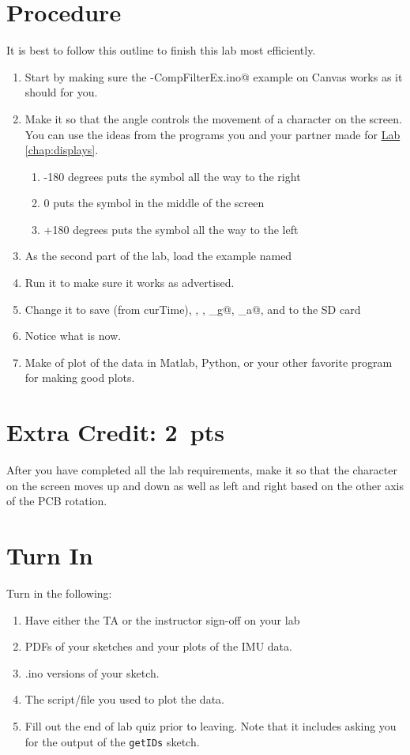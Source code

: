 \section{Procedure}
It is best to follow this outline to finish this lab most efficiently.
\begin{enumerate}
    \item Start by making sure the \lstinline@IMU-CompFilterEx.ino@ example on Canvas works as it should for you.
    \item Make it so that the angle controls the movement of a character on the screen. You can use the ideas 
            from the programs you and your partner made for \hyperref[chap:displays]{Lab \ref*{chap:displays}}.
    \begin{enumerate}
        \item -180 degrees puts the symbol all the way to the right
        \item 0 puts the symbol in the middle of the screen
        \item +180 degrees puts the symbol all the way to the left
    \end{enumerate}
    \item As the second part of the lab, load the example named \lstinline@SDReadWrite@ 
    \item Run it to make sure it works as advertised.
    \item Change it to save \lstinline@t@ (from curTime), \lstinline@ax@, \lstinline@az@, 
            \lstinline@theta_g@, \lstinline@theta_a@, and \lstinline@theta@ to the SD card 
    \item Notice what \lstinline@dt@ is now.
    \item Make of plot of the data in Matlab, Python, or your other favorite program for making good plots.
\end{enumerate}

\section{Extra Credit: 2~pts}
After you have completed all the lab requirements, make it so that the character on the screen moves
up and down as well as left and right based on the other axis of the PCB rotation.

\section{Turn In}
Turn in the following:
\begin{enumerate}
    \item Have either the TA or the instructor sign-off on your lab
    \item PDFs of your sketches and your plots of the IMU data.
    \item .ino versions of your sketch.
    \item The script/file you used to plot the data.
    \item Fill out the end of lab quiz prior to leaving. Note that it includes asking you 
            for the output of the \lstinline$getIDs$ sketch. 
\end{enumerate}

